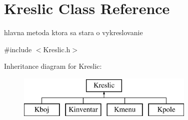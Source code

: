\hypertarget{class_kreslic}{\section{Kreslic Class Reference}
\label{class_kreslic}
}


hlavna metoda ktora sa stara o vykreslovanie  




{\ttfamily \#include $<$Kreslic.\-h$>$}

Inheritance diagram for Kreslic\-:\begin{figure}[H]
\begin{center}
\leavevmode
\includegraphics[height=2.000000cm]{class_kreslic}
\end{center}
\end{figure}
